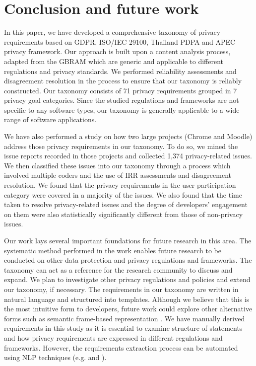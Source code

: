 \section{Conclusion and future work} \label{sec:conclusion}

In this paper, we have developed a comprehensive taxonomy of privacy requirements based on GDPR, ISO/IEC 29100, Thailand PDPA and APEC privacy framework. Our approach is built upon a content analysis process, adapted from the GBRAM which are generic and applicable to different regulations and privacy standards. We performed reliability assessments and disagreement resolution in the process to ensure that our taxonomy is reliably constructed. Our taxonomy consists of 71 privacy requirements grouped in 7 privacy goal categories. Since the studied regulations and frameworks are not specific to any software types, our taxonomy is generally applicable to a wide range of software applications.

We have also performed a study on how two large projects (Chrome and Moodle) address those privacy requirements in our taxonomy. To do so, we mined the issue reports recorded in those projects and collected 1,374 privacy-related issues. We then classified these issues into our taxonomy through a process which involved multiple coders and the use of IRR assessments and disagreement resolution. We found that the privacy requirements in the user participation category were covered in a majority of the issues. We also found that the time taken to resolve privacy-related issues and the degree of developers' engagement on them were also statistically significantly different from those of non-privacy issues.

Our work lays several important foundations for future research in this area. The systematic method performed in the work enables future research to be conducted on other data protection and privacy regulations and frameworks. The taxonomy can act as a reference for the research community to discuss and expand. We plan to investigate other privacy regulations and policies and extend our taxonomy, if necessary. The requirements in our taxonomy are written in natural language and structured into templates. Although we believe that this is the most intuitive form to developers, future work could explore other alternative forms such as semantic frame-based representation \cite{Bhatia2019}. We have manually derived requirements in this study as it is essential to examine structure of statements and how privacy requirements are expressed in different regulations and frameworks. However, the requirements extraction process can be automated using NLP techniques (e.g. \cite{Zeni2015} and \cite{Sleimi2018}).

